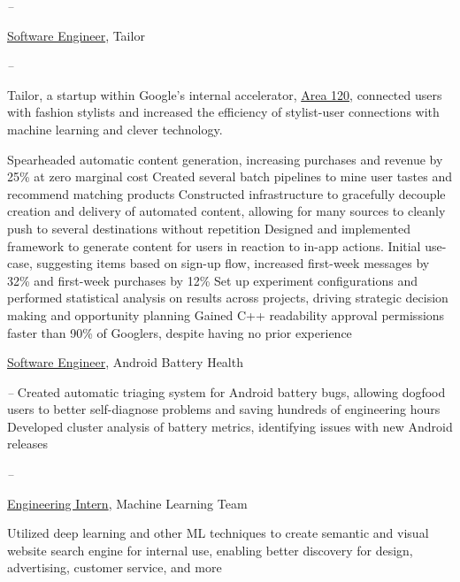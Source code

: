 \documentclass[letterpaper,nonstopmode]{simpleresumecv}
\begin{document}
\begin{Body}
\Entry
{}
\hfill \textit{ -- }
\SmallGap
\begin{Position}\underline{Software Engineer}, Tailor\end{Position}
\hfill \textit{ -- }
\Gap
\begin{Detail} Tailor, a startup within Google's internal accelerator, \href{http://area120.google.com}{Area 120}, connected users with fashion stylists and increased the efficiency of stylist-user connections with machine learning and clever technology.
\end{Detail}
\SmallGap
\BulletItem Spearheaded automatic content generation, increasing purchases and revenue by 25\% at zero marginal cost
\SubBulletItem Created several batch pipelines to mine user tastes and recommend matching products
\SubBulletItem Constructed infrastructure to gracefully decouple creation and delivery of automated content, allowing for many sources to cleanly push to several destinations without repetition 
\BulletItem Designed and implemented framework to generate content for users in reaction to in-app actions. Initial use-case, suggesting items based on sign-up flow, increased first-week messages by 32\% and first-week purchases by 12\%
\BulletItem Set up experiment configurations and performed statistical analysis on results across projects, driving strategic decision making and opportunity planning
\BulletItem Gained C++ readability approval permissions faster than 90\% of Googlers, despite having no prior experience

\Gap
\begin{Position}\underline{Software Engineer}, Android Battery Health\end{Position}
\hfill \textit{ -- }
\SmallGap
\BulletItem Created automatic triaging system for Android battery bugs, allowing dogfood users to better self-diagnose problems and saving hundreds of engineering hours
\BulletItem Developed cluster analysis of battery metrics, identifying issues with new Android releases

\BigGap
\Entry
{}
\hfill \textit{ -- }
\SmallGap
\begin{Position}\underline{Engineering Intern}, Machine Learning Team\end{Position}
\SmallGap
\BulletItem Utilized deep learning and other ML techniques to create semantic and visual website search engine for internal use, enabling better discovery for design, advertising, customer service, and more


\end{Body}
\end{document}
